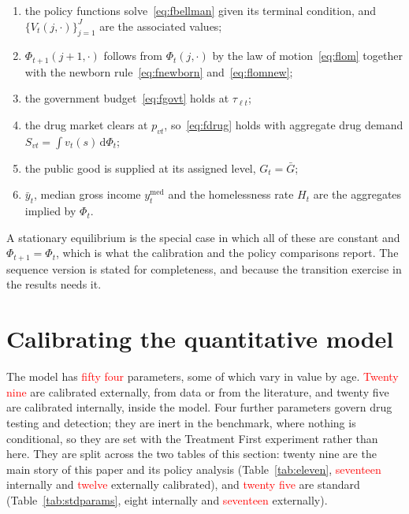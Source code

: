 \documentclass[10pt]{article}
\begin{document}
\begin{enumerate}\setlength{\itemsep}{0.1em}\setlength{\parskip}{0em}
\item the policy functions solve~\eqref{eq:fbellman} given its terminal
condition, and $\{V_t(j,\cdot)\}_{j=1}^{J}$ are the associated values;
\item $\Phi_{t+1}(j{+}1,\cdot)$ follows from $\Phi_t(j,\cdot)$ by the law of motion~\eqref{eq:flom}
together with the newborn rule~\eqref{eq:fnewborn} and~\eqref{eq:flomnew};
\item the government budget~\eqref{eq:fgovt} holds at $\tau_{\ell t}$;
\item the drug market clears at $p_{vt}$, so~\eqref{eq:fdrug} holds with
aggregate drug demand $S_{vt}=\int v_t(s)\,\mathrm{d}\Phi_t$;
\item the public good is supplied at its assigned level, $G_t=\bar G$;
\item $\bar y_t$, median gross income $y^{\text{med}}_t$ and the homelessness
rate $H_t$ are the aggregates implied by $\Phi_t$.
\end{enumerate}

A stationary equilibrium is the special case in which all of these are
constant and $\Phi_{t+1}=\Phi_t$, which is what the calibration and the policy
comparisons report. The sequence version is stated for completeness, and
because the transition exercise in the results needs it.

\section{Calibrating the quantitative model}\label{sec:fullcal}

The model has \textcolor{red}{fifty four} parameters, some of which vary in value by
age. \textcolor{red}{Twenty nine} are calibrated externally, from data or from the literature,
and twenty five are calibrated internally, inside the model. Four further parameters
govern drug testing and detection; they are inert in the benchmark, where nothing
is conditional, so they are set with the Treatment First experiment rather than
here. They are
split across the two tables of this section: twenty nine are the main story
of this paper and its policy analysis (Table~\ref{tab:eleven}, \textcolor{red}{seventeen}
internally and \textcolor{red}{twelve} externally calibrated), and \textcolor{red}{twenty five} are standard
(Table~\ref{tab:stdparams}, eight internally and \textcolor{red}{seventeen} externally).
\end{document}
